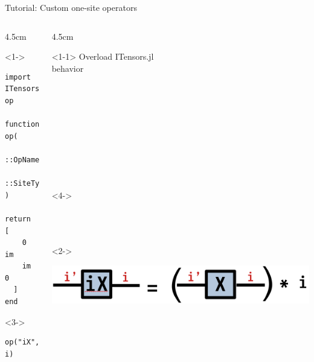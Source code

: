 \begin{frame}[fragile]{Tutorial: Custom one-site operators}

\begin{columns}

\begin{column}{4.5cm}

\begin{onlyenv}<1->

\begin{lstlisting}[language=JuliaLocal, style=julia, basicstyle=\scriptsize\ttfamily]
import ITensors: op

function op(
  ::OpName"iX",
  ::SiteType"S=1/2"
)
  return [
    0 im
    im 0
  ]
end
\end{lstlisting}

\end{onlyenv}

\begin{onlyenv}<3->

\begin{lstlisting}[language=JuliaLocal, style=julia, basicstyle=\scriptsize\ttfamily]
op("iX", i)
\end{lstlisting}

\end{onlyenv}

\end{column}

\begin{column}{4.5cm}

\begin{onlyenv}<1-1>
Overload ITensors.jl \\
behavior \\
~\\
~\\
~\\
~\\
~\\
~\\
~\\
~\\
~\\
\end{onlyenv}

\begin{onlyenv}<4->
~\\
~\\
~\\
~\\
\end{onlyenv}

\begin{onlyenv}<2->
\vspace*{0.0cm}
\begin{center}
\includegraphics[width=1.0\textwidth]{
  slides/assets/iX.png
} 
\end{center}
\vspace*{0.0cm}
\end{onlyenv}


\end{column}
\end{columns}
\end{frame}
